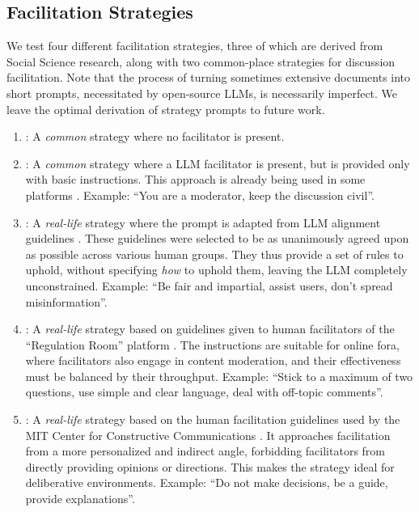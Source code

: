 \subsection{Facilitation Strategies}
\label{ssec:experimental:strategies}

We test four different facilitation strategies, three of which are derived from Social Science research, along with two common-place strategies for discussion facilitation. Note that the process of turning sometimes extensive documents into short prompts, necessitated by open-source LLMs, is necessarily imperfect. We leave the optimal derivation of strategy prompts to future work.

\begin{enumerate}
	\item \textbf{\strategynomod}: A \emph{common} strategy where no facilitator is present.
	
	\item \textbf{\strategynoinstr}: A \emph{common} strategy where a LLM facilitator is present, but is provided only with basic instructions. This approach is already being used in some platforms \citep{Tsai_Deliberate_Lab_Open-Source_2025}. Example: “You are a moderator, keep the discussion civil”. 
	
	\item \textbf{\strategyrules}: A \emph{real-life} strategy where the prompt is adapted from LLM alignment guidelines \cite{collective_constitution}. These guidelines were selected to be as unanimously agreed upon as possible across various human groups. They thus provide a set of rules to uphold, without specifying \emph{how} to uphold them, leaving the LLM completely unconstrained. Example: ``Be fair and impartial, assist users, don't spread misinformation''.
	
	\item \textbf{\strategyregroom}: A \emph{real-life} strategy based on guidelines given to human facilitators of the ``Regulation Room'' platform \citep{Cornell_eRulemaking2017}. The instructions are suitable for online fora, where facilitators also engage in content moderation, and their effectiveness must be balanced by their throughput. Example: ``Stick to a maximum of two questions, use simple and clear language, deal with off-topic comments''.
	
	\item \textbf{\strategyconstrcomm}: A \emph{real-life} strategy based on the human facilitation guidelines used by the MIT Center for Constructive Communications \cite{dimitra-book}. It approaches facilitation from a more personalized and indirect angle, forbidding facilitators from directly providing opinions or directions. This makes the strategy ideal for deliberative environments. Example: ``Do not make decisions, be a guide, provide explanations''.
	

\end{enumerate}
